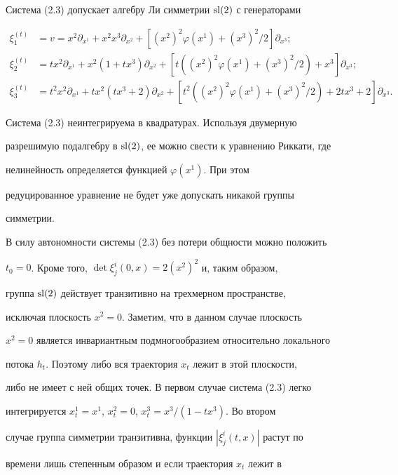 Система (2.3) допускает алгебру Ли симметрии $\operatorname{sl}(2)$ с генераторами 


\begin{align*} 


\xi^{(t)}_1&=v=x^2\partial_{x^1}+x^2x^3\partial_{x^2}+ 


[(x^2)^2\varphi(x^1)+(x^3)^2/2]\partial_{x^3};\\ 


\xi^{(t)}_2&=t x^2\partial_{x^1}+x^2(1+t x^3)\partial_{x^2}+ 


[t((x^2)^2\varphi(x^1)+(x^3)^2/2)+x^3]\partial_{x^3};\\ 


\xi^{(t)}_3&=t^2x^2\partial_{x^1}+t x^2(t x^3+2)\partial_{x^2}+ 


[t^2((x^2)^2\varphi(x^1)+(x^3)^2/2)+2t x^3+2]\partial_{x^3}. 


\end{align*} 


Система (2.3) неинтегрируема в квадратурах. Используя двумерную 


разрешимую подалгебру в $\operatorname{sl}(2)$, ее можно свести к уравнению Риккати, где 


нелинейность определяется функцией $\varphi(x^1)$. При этом 


редуцированное уравнение не будет уже допускать никакой группы 


симметрии. 


 


В силу автономности системы (2.3) без потери общности можно положить 


$t_0=0$. Кроме того, $\det\xi^i_j(0,x)=2(x^2)^2$ и, таким образом, 


группа $\operatorname{sl}(2)$ действует транзитивно на трехмерном пространстве, 


исключая плоскость $x^2=0$. Заметим, что в данном случае плоскость 


$x^2=0$ является инвариантным подмногообразием относительно локального 


потока $h_t$. Поэтому либо вся траектория $x_t$ лежит в этой плоскости, 


либо не имеет с ней общих точек. В первом случае система (2.3) легко 


интегрируется $x^1_t=x^1$, $x^2_t=0$, $x^3_t=x^3/(1-t x^3)$. Во втором 


случае группа симметрии транзитивна, функции $|\xi^i_j(t,x)|$ растут по 


времени лишь степенным образом и если траектория $x_t$ лежит в 


